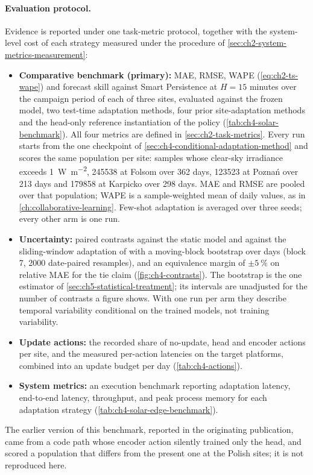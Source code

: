 \paragraph{Evaluation protocol.} Evidence is reported under one task-metric protocol, together with the system-level cost of each strategy measured under the procedure of \cref{sec:ch2-system-metrics-measurement}:
\begin{itemize}
  \item \textbf{Comparative benchmark (primary):} MAE, RMSE, WAPE (\cref{eq:ch2-ts-wape}) and forecast skill against Smart Persistence at $H=15$ minutes over the campaign period of each of three sites, evaluated against the frozen model, two test-time adaptation methods, four prior site-adaptation methods and the head-only reference instantiation of the policy (\cref{tab:ch4-solar-benchmark}). All four metrics are defined in \cref{sec:ch2-task-metrics}. Every run starts from the one checkpoint of \cref{sec:ch4-conditional-adaptation-method} and scores the same population per site: samples whose clear-sky irradiance exceeds \SI{1}{\watt\per\square\meter}, \num{245538} at Folsom over 362 days, \num{123523} at Poznań over 213 days and \num{179858} at Karpicko over 298 days. MAE and RMSE are pooled over that population; WAPE is a sample-weighted mean of daily values, as in \cref{ch:collaborative-learning}. Few-shot adaptation is averaged over three seeds; every other arm is one run.
  \item \textbf{Uncertainty:} paired contrasts against the static model and against the sliding-window adaptation of \citet{LARABENITEZ2023126312} with a moving-block bootstrap over days (block 7, 2000 date-paired resamples), and an equivalence margin of $\pm\SI{5}{\percent}$ on relative MAE for the tie claim (\cref{fig:ch4-contrasts}). The bootstrap is the one estimator of \cref{sec:ch5-statistical-treatment}; its intervals are unadjusted for the number of contrasts a figure shows. With one run per arm they describe temporal variability conditional on the trained models, not training variability.
  \item \textbf{Update actions:} the recorded share of no-update, head and encoder actions per site, and the measured per-action latencies on the target platforms, combined into an update budget per day (\cref{tab:ch4-actions}).
  \item \textbf{System metrics:} an execution benchmark reporting adaptation latency, end-to-end latency, throughput, and peak process memory for each adaptation strategy (\cref{tab:ch4-solar-edge-benchmark}).
\end{itemize}
The earlier version of this benchmark, reported in the originating publication, came from a code path whose encoder action silently trained only the head, and scored a population that differs from the present one at the Polish sites; it is not reproduced here.

